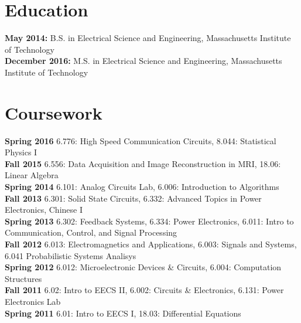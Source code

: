 \documentclass{res}
\begin{document}
 


\address{mspatz@mit.edu\\mark.h.spatz@gmail.com  }
\address{(816)-679-1502}

\begin{resume}
        
\section{Education}
\vspace{0.05in} 

{\bf May 2014:} B.S. in Electrical Science and Engineering, Massachusetts Institute of Technology\\
{\bf December 2016:} M.S. in Electrical Science and Engineering, Massachusetts Institute of Technology
\section{Coursework}
	\vspace{0.05in}
	{\bf Spring 2016} 6.776: High Speed Communication Circuits, 8.044: Statistical Physics I\vspace{0.05in}\\
	{\bf Fall 2015} 6.556: Data Acquisition and Image Reconstruction in MRI, 18.06: Linear Algebra\vspace{0.05in}\\
    {\bf Spring 2014} 6.101: Analog Circuits Lab, 6.006: Introduction to Algorithms \vspace{0.05in}\\
    {\bf Fall 2013} 6.301: Solid State Circuits, 6.332: Advanced Topics in Power Electronics, Chinese I \vspace{0.05in}\\
    {\bf Spring 2013} 6.302: Feedback Systems, 6.334: Power Electronics, 6.011: Intro to Communication, Control, and Signal Processing \vspace{0.05in}\\
    {\bf Fall 2012} 6.013: Electromagnetics and Applications, 6.003: Signals and Systems, 6.041 Probabilistic Systems Analisys \vspace{0.05in}\\
    {\bf Spring 2012} 6.012: Microelectronic Devices \& Circuits, 6.004: Computation Structures \vspace{0.05in}\\
    {\bf Fall 2011}  6.02: Intro to EECS II, 6.002: Circuits \& Electronics, 6.131: Power Electronics Lab\vspace{0.05in}\\    
    {\bf Spring 2011} 6.01: Intro to EECS I, 18.03: Differential Equations

\end{resume}
\end{document}
